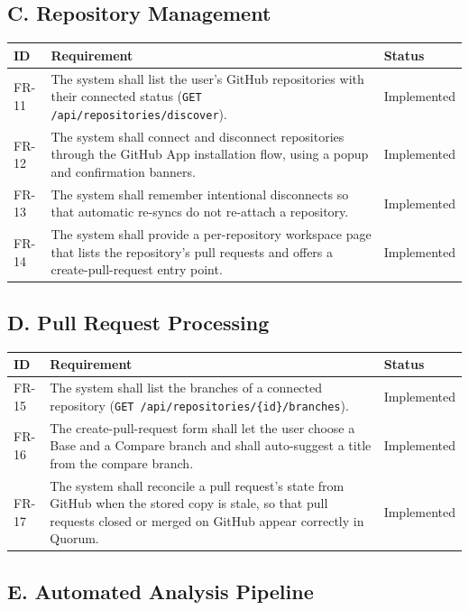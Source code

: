 \subsection{C. Repository Management}

\begin{longtable}{@{}p{1.4cm}p{11.6cm}p{2.0cm}@{}}
\toprule
\textbf{ID} & \textbf{Requirement} & \textbf{Status} \\
\midrule
\endhead
FR-11 & The system shall list the user's GitHub repositories with their
connected status (\texttt{GET /api/repositories/discover}). & Implemented \\
FR-12 & The system shall connect and disconnect repositories through the
GitHub App installation flow, using a popup and confirmation banners. & Implemented \\
FR-13 & The system shall remember intentional disconnects so that automatic
re-syncs do not re-attach a repository. & Implemented \\
FR-14 & The system shall provide a per-repository workspace page that lists the
repository's pull requests and offers a create-pull-request entry point. & Implemented \\
\bottomrule
\end{longtable}

\subsection{D. Pull Request Processing}

\begin{longtable}{@{}p{1.4cm}p{11.6cm}p{2.0cm}@{}}
\toprule
\textbf{ID} & \textbf{Requirement} & \textbf{Status} \\
\midrule
\endhead
FR-15 & The system shall list the branches of a connected repository
(\texttt{GET /api/repositories/\{id\}/branches}). & Implemented \\
FR-16 & The create-pull-request form shall let the user choose a Base and a
Compare branch and shall auto-suggest a title from the compare branch. & Implemented \\
FR-17 & The system shall reconcile a pull request's state from GitHub when the
stored copy is stale, so that pull requests closed or merged on GitHub appear
correctly in Quorum. & Implemented \\
\bottomrule
\end{longtable}

\subsection{E. Automated Analysis Pipeline}

